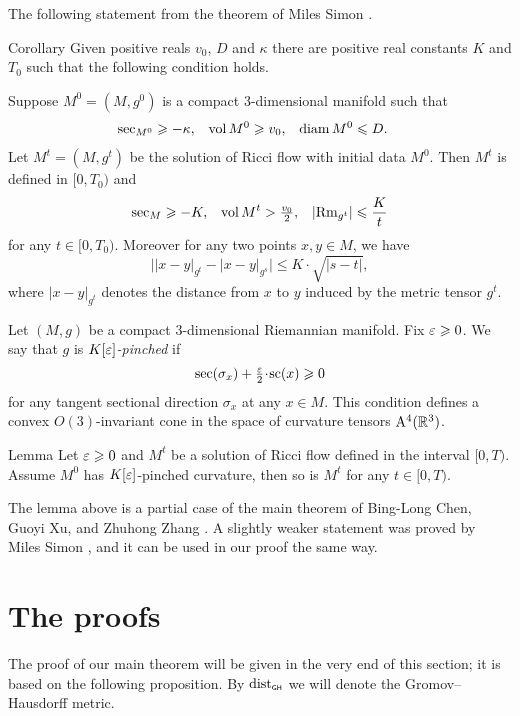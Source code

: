 \documentclass[a4paper,10pt]{amsart}
\begin{document}
The following statement from the theorem of Miles Simon \cite[Theorem 1.9]{simon-non-collapsed}.

\begin{thm}{Corollary}\label{cor:simon}
Given positive reals $v_0$, $D$ and $\kappa$
there are positive real constants $K$ and $T_0$
such that the following condition holds.

Suppose $M^0=(M,g^0)$ is a compact $3$-dimensional manifold 
such that 
\begin{align*}
\mathrm{sec}_{M^0}&\geqslant -\kappa,
&
\operatorname{vol} M^0&\geqslant v_0,
&
\operatorname{diam} M^0&\leqslant D.
\end{align*}
Let $M^t=(M,g^t)$ be the solution of Ricci flow with initial data $M^0$.
Then $M^t$ is defined in $[0,T_0)$ and 
\begin{align*}
\mathrm{sec}_M&\geqslant -K,
&
\operatorname{vol} M^t&>\tfrac{v_0}2,
&
|{\mathrm{Rm}}_{g^t}|\leqslant \frac Kt
\end{align*}
for any $t\in [0,T_0)$.
Moreover for any two points $x,y\in M$, we have
$$\bigl||x-y|_{g^t}-|x-y|_{g^s}\bigr|
\le 
K\cdot \sqrt{|s-t|},$$
where $|x-y|_{g^t}$ denotes the distance from $x$ to $y$ 
induced by the metric tensor $g^t$. 
\end{thm}

Let $(M,g)$ be a compact 3-dimensional Riemannian manifold.
Fix $\varepsilon\geqslant0$.
We say that $g$ is \emph{$K[\varepsilon]$-pinched} if 
\[\Sec(\sigma_x)+\tfrac\eps2\cdot\R(x)\ge 0\]
for any tangent sectional direction $\sigma_x$ at any $x\in M$.
This condition defines a convex $O(3)$-invariant cone in the space of curvature tensors $\mathrm{A}^4(\mathbb{R}^3)$.

\begin{thm}{Lemma}\label{lem:pinching}
Let $\varepsilon\geqslant 0$ and 
$M^t$ be a solution of Ricci flow defined in the interval $[0,T)$.
Assume $M^0$ has $K[\varepsilon]$-pinched curvature,
then so is $M^t$ for any $t\in[0,T)$.
\end{thm}

The lemma above is a partial case of the main theorem of 
Bing-Long Chen,
Guoyi Xu, and
Zhuhong Zhang \cite{chen-xu-zhang}.
A slightly weaker statement was proved by Miles Simon \cite[Lemma 5.1]{simon},
and it can be used in our proof the same way.


\section{The proofs}\label{sec:rough-smooth}

The proof of our main theorem will be given in the very end of this section;
it is based on the following proposition.
By $\operatorname{dist}_{\text{\sf\tiny GH}}$ we will denote the Gromov--Hausdorff metric.
\end{document}
